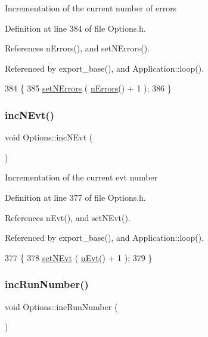 Incrementation of the current number of errors 

Definition at line 384 of file Options.\+h.



References n\+Errors(), and set\+N\+Errors().



Referenced by export\+\_\+base(), and Application\+::loop().


\begin{DoxyCode}
384                           \{
385                 \hyperlink{classOptions_a45368b495036869c67fe0e6bf9abc4e6}{setNErrors} ( \hyperlink{classOptions_acc6474323f0bbe17fa844e9a086b90b8}{nErrors}() + 1 );
386         \}
\end{DoxyCode}
\mbox{\label{classOptions_aa950f9861182c76c4005668e0b7f012a}} 
\subsubsection{\texorpdfstring{inc\+N\+Evt()}{incNEvt()}}
{\footnotesize\ttfamily void Options\+::inc\+N\+Evt (\begin{DoxyParamCaption}{ }\end{DoxyParamCaption})\hspace{0.3cm}{\ttfamily [inline]}}

Incrementation of the current evt number 

Definition at line 377 of file Options.\+h.



References n\+Evt(), and set\+N\+Evt().



Referenced by export\+\_\+base(), and Application\+::loop().


\begin{DoxyCode}
377                        \{
378                 \hyperlink{classOptions_ae6a0fdaa736948f5040deb3eb6889268}{setNEvt} ( \hyperlink{classOptions_ad769b256263a4ac24dd6f989ae724ab7}{nEvt}() + 1 );
379         \}
\end{DoxyCode}
\mbox{\label{classOptions_a0bf512fc9126cd76acabaa4c3b65d7fb}} 
\subsubsection{\texorpdfstring{inc\+Run\+Number()}{incRunNumber()}}
{\footnotesize\ttfamily void Options\+::inc\+Run\+Number (\begin{DoxyParamCaption}{ }\end{DoxyParamCaption})}

